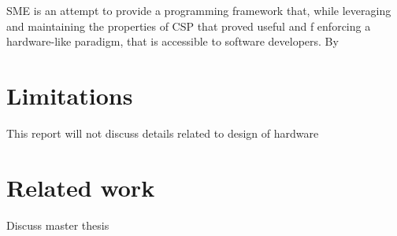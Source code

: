 SME is an attempt to provide a programming framework that, while
leveraging and maintaining the properties of CSP that proved useful
and f enforcing a hardware-like paradigm, that is accessible to
software developers. By \cite{vinter2014synchronous}

\section{Limitations}
This report will not discuss details related to design of hardware

\section{Related work}
Discuss master thesis

